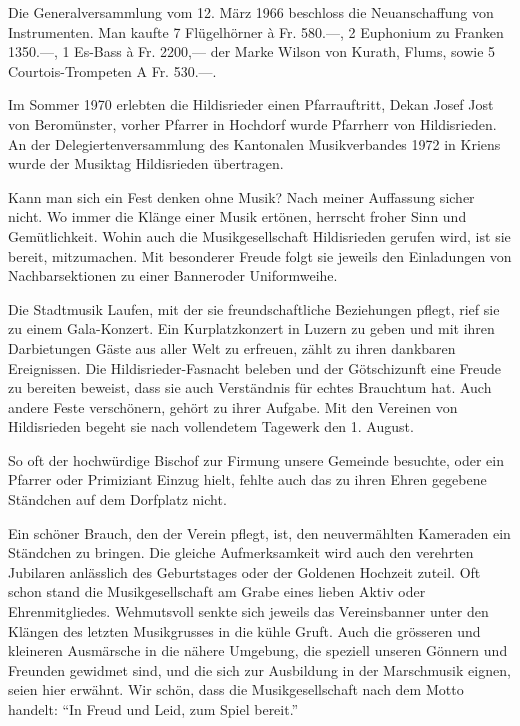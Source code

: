 \begin{history}
    Die Generalversammlung vom 12. März 1966 beschloss die Neuanschaffung von
    Instrumenten. Man kaufte 7 Flügelhörner à Fr. 580.—, 2 Euphonium zu Franken
    1350.—, 1 Es-Bass à Fr. 2200,— der Marke Wilson von Kurath, Flums, sowie 5
    Courtois-Trompeten A Fr. 530.—.

    Im Sommer 1970 erlebten die Hildisrieder einen Pfarrauftritt, Dekan Josef
    Jost von Beromünster, vorher Pfarrer in Hochdorf wurde Pfarrherr von
    Hildisrieden. An der Delegiertenversammlung des Kantonalen Musikverbandes
    1972 in Kriens wurde der Musiktag Hildisrieden übertragen.

    Kann man sich ein Fest denken ohne Musik? Nach meiner Auffassung sicher
    nicht. Wo immer die Klänge einer Musik ertönen, herrscht froher Sinn und
    Gemütlichkeit. Wohin auch die Musikgesellschaft Hildisrieden gerufen wird,
    ist sie bereit, mitzumachen. Mit besonderer Freude folgt sie jeweils den
    Einladungen von Nachbarsektionen zu einer Banneroder Uniformweihe.

    Die Stadtmusik Laufen, mit der sie freundschaftliche Beziehungen pflegt,
    rief sie zu einem Gala-Konzert. Ein Kurplatzkonzert in Luzern zu geben und
    mit ihren Darbietungen Gäste aus aller Welt zu erfreuen, zählt zu ihren
    dankbaren Ereignissen. Die Hildisrieder-Fasnacht beleben und der
    Götschizunft eine Freude zu bereiten beweist, dass sie auch Verständnis für
    echtes Brauchtum hat. Auch andere Feste verschönern, gehört zu ihrer
    Aufgabe. Mit den Vereinen von Hildisrieden begeht sie nach vollendetem
    Tagewerk den 1. August.

    So oft der hochwürdige Bischof zur Firmung unsere Gemeinde besuchte, oder
    ein Pfarrer oder Primiziant Einzug hielt, fehlte auch das zu ihren Ehren
    gegebene Ständchen auf dem Dorfplatz nicht.

    Ein schöner Brauch, den der Verein pflegt, ist, den neuvermählten Kameraden
    ein Ständchen zu bringen. Die gleiche Aufmerksamkeit wird auch den verehrten
    Jubilaren anlässlich des Geburtstages oder der Goldenen Hochzeit zuteil. Oft
    schon stand die Musikgesellschaft am Grabe eines lieben Aktiv oder
    Ehrenmitgliedes. Wehmutsvoll senkte sich jeweils das Vereinsbanner unter den
    Klängen des letzten Musikgrusses in die kühle Gruft. Auch die grösseren und
    kleineren Ausmärsche in die nähere Umgebung, die speziell unseren Gönnern
    und Freunden gewidmet sind, und die sich zur Ausbildung in der Marschmusik
    eignen, seien hier erwähnt. Wir schön, dass die Musikgesellschaft nach dem
    Motto handelt: \enquote{In Freud und Leid, zum Spiel bereit.}


\end{history}
